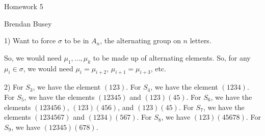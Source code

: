 \documentclass[executivepaper]{article}
\begin{document}
\vspace*{-40mm}

\begin{center}

Homework 5

\end{center}

\begin{flushright}

Brendan Busey

\end{flushright}

\begin{flushleft}

1) Want to force $\sigma$ to be in $A_{n}$, the alternating group on $n$ letters.

\begin{center}

So, we would need $\mu_{1},...,\mu_{k}$ to be made up of alternating elements. So, for any $\mu_{i} \in \sigma$, we would need $\mu_{i}=\mu_{i+2}$, $\mu_{i+1}=\mu_{i+3}$, etc.

\end{center}

\end{flushleft}

\begin{flushleft}

2) For $S_{3}$, we have the element $(123)$. For $S_{4}$, we have the element $(1234)$. For $S_{5}$, we have the elements $(12345)$ and $(123)(45)$. For $S_{6}$, we have the elements $(123456)$, $(123)(456)$, and $(123)(45)$. For $S_{7}$, we have the elements $(1234567)$ and $(1234)(567)$. For $S_{8}$, we have $(123)(45678)$. For $S_{9}$, we have $(12345)(678)$.

\end{flushleft}
\end{document}
